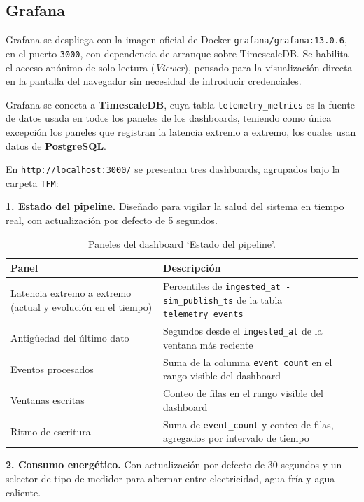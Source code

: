 \subsection{Grafana}
\label{sec:grafana}

Grafana se despliega con la imagen oficial de Docker \texttt{grafana/grafana:13.0.6}, en el puerto \texttt{3000}, con dependencia de arranque sobre TimescaleDB. Se habilita el acceso anónimo de solo lectura (\textit{Viewer}), pensado para la visualización directa en la pantalla del navegador sin necesidad de introducir credenciales.

Grafana se conecta a \textbf{TimescaleDB}, cuya tabla \texttt{telemetry\_metrics} es la fuente de datos usada en todos los paneles de los dashboards, teniendo como única excepción los paneles que registran la latencia extremo a extremo, los cuales usan datos de \textbf{PostgreSQL}.

En \texttt{http://localhost:3000/} se presentan tres dashboards, agrupados bajo la carpeta \texttt{TFM}:

\textbf{1. Estado del pipeline.} Diseñado para vigilar la salud del sistema en tiempo real, con actualización por defecto de 5 segundos.

\begin{table}[H]
  \centering
  \begin{tabular}{|p{4.5cm}|p{9cm}|}
    \hline
    \textbf{Panel} & \textbf{Descripción} \\ \hline
    Latencia extremo a extremo (actual y evolución en el tiempo) & Percentiles de \texttt{ingested\_at - sim\_publish\_ts} de la tabla \texttt{telemetry\_events} \\ \hline
    Antigüedad del último dato & Segundos desde el \texttt{ingested\_at} de la ventana más reciente \\ \hline
    Eventos procesados & Suma de la columna \texttt{event\_count} en el rango visible del dashboard \\ \hline
    Ventanas escritas & Conteo de filas en el rango visible del dashboard \\ \hline
    Ritmo de escritura & Suma de \texttt{event\_count} y conteo de filas, agregados por intervalo de tiempo \\ \hline
  \end{tabular}
  \caption{Paneles del dashboard `Estado del pipeline'.}
  \label{tab:grafana-pipeline}
\end{table}

\textbf{2. Consumo energético.} Con actualización por defecto de 30 segundos y un selector de tipo de medidor para alternar entre electricidad, agua fría y agua caliente.

